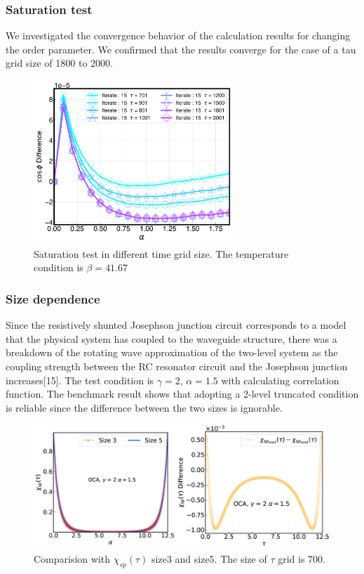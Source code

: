 \documentclass{article}[12pt]
\begin{document}
\begin{spacing}{1.5}
\subsubsection*{Saturation test}
We investigated the convergence behavior of the calculation results for changing the order parameter. 
We confirmed that the results converge for the case of a tau grid size of 1800 to 2000. 
\begin{figure}[htbp]
  \centerline{\includegraphics[width=7.5cm]{TexFigure/4_2_01_saturation.png}}
  \caption{Saturation test in different time grid size. The temperature condition is $\beta = 41.67$}
\end{figure}
\subsubsection*{Size dependence}
Since the resistively shunted Josephson junction circuit corresponds to a model that the physical system has coupled to the waveguide structure,
there was a breakdown of the rotating wave approximation of the two-level system as the coupling strength between the RC resonator circuit 
and the Josephson junction increases[15]. The test condition is $\gamma =2$, $\alpha = 1.5$ with calculating correlation function. 
The benchmark result shows that adopting a 2-level truncated condition is reliable since the difference between the two sizes is ignorable.
\begin{figure}[H]
  \centerline{\includegraphics[width=15cm]{TexFigure/4_2_02_sizediff.png}}
  \caption{Comparision with $\chi_{sp}(\tau)$ size3 and size5. The size of $\tau$ grid is 700.}
\end{figure}
\pagebreak

\end{spacing}
\end{document}
